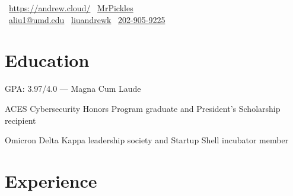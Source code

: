 \documentclass[]{template}
\begin{document}
\lastupdated

{
  \faHome \, \url{https://andrew.cloud/}
  \textcolor{white}{\textbullet} %
  \faGithub \, \href{https://github.com/MrPickles}{MrPickles}
  \\ %
  \faEnvelope \, \href{mailto:aliu1@umd.edu}{aliu1@umd.edu}
  \textcolor{white}{\textbullet} %
  \faLinkedin \, \href{https://linkedin.com/in/liuandrewk}{liuandrewk}
  \textcolor{white}{\textbullet} %
  \faPhone \, \href{tel:2029059225}{202-905-9225}
}

\section{Education}
\begin{tightemize}
\item GPA: 3.97/4.0 --- Magna Cum Laude
\item ACES Cybersecurity Honors Program graduate
      and President's Scholarship recipient
\item Omicron Delta Kappa leadership society
      and Startup Shell incubator member
\end{tightemize}
\sectionsep

\section{Experience}
\end{document}

